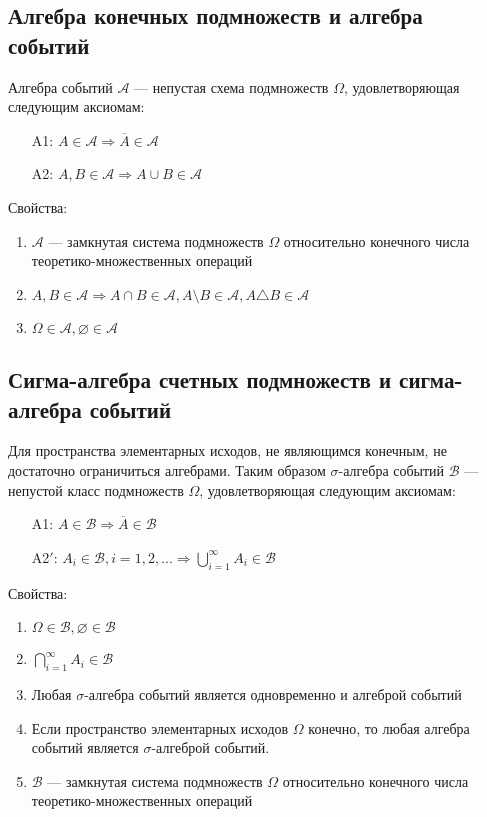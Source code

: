 \documentclass[12pt]{article}
\begin{document}
\subsection{Алгебра конечных подмножеств и алгебра событий}
Алгебра событий $\mathcal{A}$ --- непустая схема подмножеств $\Omega$, удовлетворяющая следующим аксиомам:
\begin{itemize}
	\item[A1:] $A \in \mathcal{A} \Rightarrow \overline{A} \in \mathcal{A}$
	\item[A2:] $A,B \in \mathcal{A} \Rightarrow A \cup B \in \mathcal{A}$
\end{itemize}

Свойства:
\begin{enumerate}
	\item $\mathcal{A}$ --- замкнутая система подмножеств $\Omega$ относительно конечного числа теоретико-множественных операций
	\item $A,B \in \mathcal{A} \Rightarrow A \cap B \in \mathcal{A}, A \setminus B \in \mathcal{A}, A \triangle B \in \mathcal{A}$
	\item $\Omega \in \mathcal{A}, \varnothing \in \mathcal{A}$
\end{enumerate}

\subsection{Сигма-алгебра счетных подмножеств и сигма-алгебра событий}
Для пространства элементарных исходов, не являющимся конечным, не достаточно ограничиться алгебрами.
Таким образом $\sigma$-алгебра событий $\mathcal{B}$ --- непустой класс подмножеств $\Omega$, удовлетворяющая следующим аксиомам:
\begin{itemize}
	\item[A1:] $A \in \mathcal{B} \Rightarrow \overline{A} \in \mathcal{B}$
	\item[A2$'$:] $A_i \in \mathcal{B}, i = 1,2,... \Rightarrow \bigcup^{\infty}_{i = 1}A_i \in \mathcal{B}$
\end{itemize}

Свойства:
\begin{enumerate}
	\item $\Omega \in \mathcal{B}, \varnothing \in \mathcal{B}$
	\item $\bigcap^{\infty}_{i=1}A_i \in \mathcal{B}$
	\item Любая $\sigma$-алгебра событий является одновременно и алгеброй событий
	\item Если пространство элементарных исходов $\Omega$ конечно,
	      то любая алгебра событий является $\sigma$-алгеброй событий.
	\item $\mathcal{B}$ --- замкнутая система подмножеств $\Omega$ относительно конечного числа теоретико-множественных операций
\end{enumerate}
\end{document}
